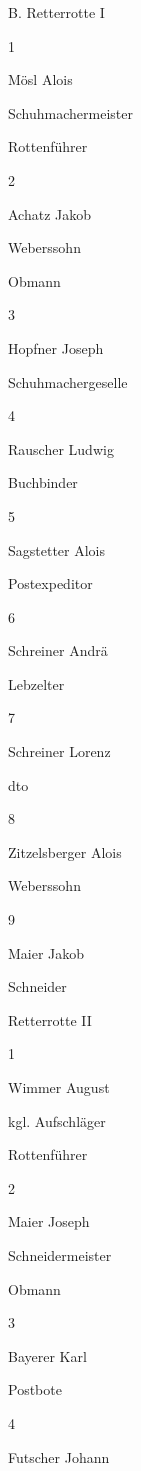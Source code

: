 B. Retterrotte I

1

Mösl Alois

Schuhmachermeister

Rottenführer

2

Achatz Jakob

Weberssohn

Obmann

3

Hopfner Joseph

Schuhmachergeselle



4

Rauscher Ludwig

Buchbinder



5

Sagstetter Alois

Postexpeditor



6

Schreiner Andrä

Lebzelter



7

Schreiner Lorenz

dto



8

Zitzelsberger Alois

Weberssohn



9

Maier Jakob

Schneider





Retterrotte II

1

Wimmer August

kgl. Aufschläger

Rottenführer

2

Maier Joseph

Schneidermeister

Obmann

3

Bayerer Karl

Postbote



4

Futscher Johann

